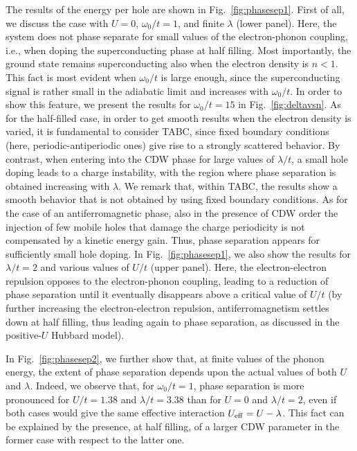 \documentclass[aps,superscriptaddress,amsmath,amssymb,twocolumn,showpacs,floatfix,english]{revtex4}
\begin{document}
The results of the energy per hole are shown in Fig.~\ref{fig:phasesep1}. First of all, we discuss the case with $U=0$, $\omega_0/t=1$, and 
finite $\lambda$ (lower panel). Here, the system does not phase separate for small values of the electron-phonon coupling, i.e., when doping 
the superconducting phase at half filling. Most importantly, the ground state remains superconducting also when the electron density is
$n<1$. This fact is most evident when $\omega_0/t$ is large enough, since the superconducting signal is rather small in the adiabatic 
limit and increases with $\omega_0/t$. In order to show this feature, we present the results for $\omega_0/t=15$ in Fig.~\ref{fig:deltavsn}. 
As for the half-filled case, in order to get smooth results when the electron density is varied, it is fundamental to consider TABC, since
fixed boundary conditions (here, periodic-antiperiodic ones) give rise to a strongly scattered behavior. By contrast, when entering into 
the CDW phase for large values of $\lambda/t$, a small hole doping leads to a charge instability, with the region where phase separation is 
obtained increasing with $\lambda$. We remark that, within TABC, the results show a smooth behavior that is not obtained by using fixed boundary 
conditions. As for the case of an antiferromagnetic phase, also in the presence of CDW order the injection of few mobile holes that damage 
the charge periodicity is not compensated by a kinetic energy gain. Thus, phase separation appears for sufficiently small hole doping. 
In Fig.~\ref{fig:phasesep1}, we also show the results for $\lambda/t=2$ and various values of $U/t$ (upper panel). Here, the electron-electron 
repulsion opposes to the electron-phonon coupling, leading to a reduction of phase separation until it eventually disappears above a 
critical value of $U/t$ (by further increasing the electron-electron repulsion, antiferromagnetism settles down at half filling, thus 
leading again to phase separation, as discussed in the positive-$U$ Hubbard model).

In Fig.~\ref{fig:phasesep2}, we further show that, at finite values of the phonon energy, the extent of phase separation depends upon the 
actual values of both $U$ and $\lambda$. Indeed, we observe that, for $\omega_0/t=1$, phase separation is more pronounced for $U/t=1.38$ 
and $\lambda/t=3.38$ than for $U=0$ and $\lambda/t=2$, even if both cases would give the same effective interaction $U_{\rm eff}=U-\lambda$. 
This fact can be explained by the presence, at half filling, of a larger CDW parameter in the former case with respect to the latter one. 
\end{document}
